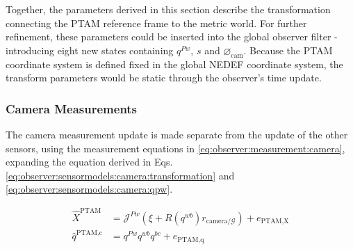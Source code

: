         Together, the parameters derived in this section describe the transformation
        connecting the PTAM reference frame to the metric world.
        For further refinement, these parameters could be inserted into the
        global observer filter - introducing eight new states containing
        $q^{Pw}$, $s$ and $\varnothing_{\text{cam}}$.%
        Because the PTAM coordinate system is defined fixed in the global NEDEF coordinate system,
        the transform parameters would be static through the observer's time update.

    \subsubsection{Camera Measurements}
        \label{sssec:observer:sensormodels:camera:refinement}
        The camera measurement update is made separate from the update of the other sensors, using
        the measurement equations in \eqref{eq:observer:measurement:camera}, expanding the
        equation derived in Eqs. \eqref{eq:observer:sensormodels:camera:transformation} and \eqref{eq:observer:sensormodels:camera:qpw}.

        \begin{subequations}
            \label{eq:observer:measurement:camera}
            \begin{align}
                \hat{X}^{\text{PTAM}} &= \mathcal{J}^{Pw} (\xi + R(q^{wb})r_{\text{camera}/\mathcal{G}}) + e_{\text{PTAM,X}} \\
                \hat{q}^{\text{PTAM,c}} &= q^{Pw} q^{wb} q^{bc} + e_{\text{PTAM,q}}
            \end{align}
        \end{subequations}

